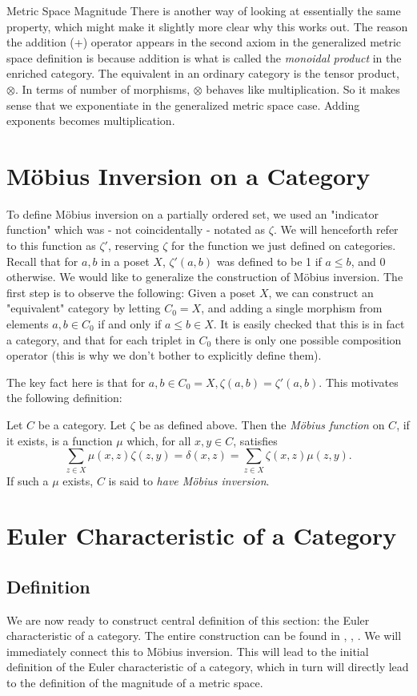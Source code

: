 \documentclass[12pt]{pom_thesis}
\begin{document}
\begin{chapter}{Metric Space Magnitude}
There is another way of looking at essentially the same property, which might make it slightly more clear why this works out. The reason the addition (+) operator appears in the second axiom in the generalized metric space definition is because addition is what is called the \textit{monoidal product} in the enriched category. The equivalent in an ordinary category is the tensor product, $\otimes$. In terms of number of morphisms, $\otimes$ behaves like multiplication. So it makes sense that we exponentiate in the generalized metric space case. Adding exponents becomes multiplication.
\section{M\"obius Inversion on a Category}
To define M\"obius inversion on a partially ordered set, we used an "indicator function" which was - not coincidentally - notated as $\zeta$. We will henceforth refer to this function as $\zeta'$, reserving $\zeta$ for the function we just defined on categories. Recall that for $a,b$ in a poset $X$, $\zeta'(a,b)$ was defined to be 1 if $a \leq b$, and 0 otherwise. We would like to generalize the construction of M\"obius inversion. The first step is to observe the following: Given a poset $X$, we can construct an "equivalent" category by letting $C_0=X$, and adding a single morphism from elements $a,b \in C_0$ if and only if $a \leq b \in X$. It is easily checked that this is in fact a category, and that for each triplet in $C_0$ there is only one possible composition operator (this is why we don't bother to explicitly define them). 

The key fact here is that for $a,b \in C_0 = X, \zeta(a,b) = \zeta'(a,b)$. This motivates the following definition:
\begin{defn}\label{cat_mob} %
Let $C$ be a category. Let $\zeta$ be as defined above. Then the \emph{M\"obius function} on $C$, if it exists, is a function $\mu$ which, for all $x,y \in C$, satisfies
\[
\sum_{z \in X} \mu(x,z)\zeta(z,y) = \delta(x,z) = \sum_{z \in X} \zeta(x,z)\mu(z,y).
\]
If such a $\mu$ exists, $C$ is said to \emph{have M\"obius inversion}. %
\end{defn}
\section{Euler Characteristic of a Category}
\subsection{Definition}
We are now ready to construct central definition of this section: the Euler characteristic of a category. The entire construction can be found in \cite{Lein1}, \cite{Lein2}, \cite{Lein4}. We will immediately connect this to M\"obius inversion. This will lead to the initial definition of the Euler characteristic of a category, which in turn will directly lead to the definition of the magnitude of a metric space.


\end{chapter}
\end{document}
